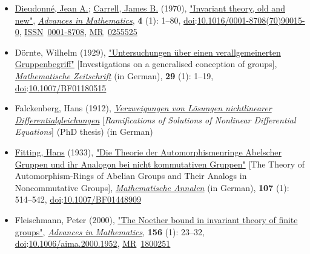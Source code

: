 \begin{itemize}
\item
  \href{https://en.wikipedia.org/wiki/Jean_A._Dieudonné}{Dieudonné, Jean A.}; \href{https://en.wikipedia.org/wiki/James_B._Carrell}{Carrell, James B.} (1970), \href{https://doi.org/10.1016\%2F0001-8708\%2870\%2990015-0}{"Invariant theory, old and new"}, \emph{\href{https://en.wikipedia.org/wiki/Advances_in_Mathematics}{Advances in Mathematics}}, \textbf{4} (1): {1--}80, \href{https://en.wikipedia.org/wiki/Doi_(identifier)}{doi}:{\href{https://doi.org/10.1016\%2F0001-8708\%2870\%2990015-0}{10.1016/0001-8708(70)90015-0}}, \href{https://en.wikipedia.org/wiki/ISSN_(identifier)}{ISSN}{~}\href{https://search.worldcat.org/issn/0001-8708}{0001-8708}, \href{https://en.wikipedia.org/wiki/MR_(identifier)}{MR}{~}\href{https://mathscinet.ams.org/mathscinet-getitem?mr=0255525}{0255525}{}
\item
  Dörnte, Wilhelm (1929), \href{http://gdz.sub.uni-goettingen.de/dms/resolveppn/?PPN=GDZPPN002370530}{"Untersuchungen über einen verallgemeinerten Gruppenbegriff"} {{[}}Investigations on a generalised conception of groups{{]}}, \emph{\href{https://en.wikipedia.org/wiki/Mathematische_Zeitschrift}{Mathematische Zeitschrift}} (in German), \textbf{29} (1): {1--}19, \href{https://en.wikipedia.org/wiki/Doi_(identifier)}{doi}:\href{https://doi.org/10.1007\%2FBF01180515}{10.1007/BF01180515}{}
\item
  Falckenberg, Hans (1912), \href{https://gdz.sub.uni-goettingen.de/id/PPN314875379}{\emph{Verzweigungen von Lösungen nichtlinearer Differentialgleichungen}} {{[}}\emph{Ramifications of Solutions of Nonlinear Differential Equations}{{]}} (PhD thesis) (in German){}
\item
  \href{https://en.wikipedia.org/wiki/Hans_Fitting}{Fitting, Hans} (1933), \href{https://gdz.sub.uni-goettingen.de/id/PPN235181684_0107}{"Die Theorie der Automorphismenringe Abelscher Gruppen und ihr Analogon bei nicht kommutativen Gruppen"} {{[}}The Theory of Automorphism-Rings of Abelian Groups and Their Analogs in Noncommutative Groups{{]}}, \emph{\href{https://en.wikipedia.org/wiki/Mathematische_Annalen}{Mathematische Annalen}} (in German), \textbf{107} (1): {514--}542, \href{https://en.wikipedia.org/wiki/Doi_(identifier)}{doi}:\href{https://doi.org/10.1007\%2FBF01448909}{10.1007/BF01448909}{}
\item
  Fleischmann, Peter (2000), \href{https://doi.org/10.1006\%2Faima.2000.1952}{"The Noether bound in invariant theory of finite groups"}, \emph{\href{https://en.wikipedia.org/wiki/Advances_in_Mathematics}{Advances in Mathematics}}, \textbf{156} (1): {23--}32, \href{https://en.wikipedia.org/wiki/Doi_(identifier)}{doi}:{\href{https://doi.org/10.1006\%2Faima.2000.1952}{10.1006/aima.2000.1952}}, \href{https://en.wikipedia.org/wiki/MR_(identifier)}{MR}{~}\href{https://mathscinet.ams.org/mathscinet-getitem?mr=1800251}{1800251}{}

\end{itemize}
